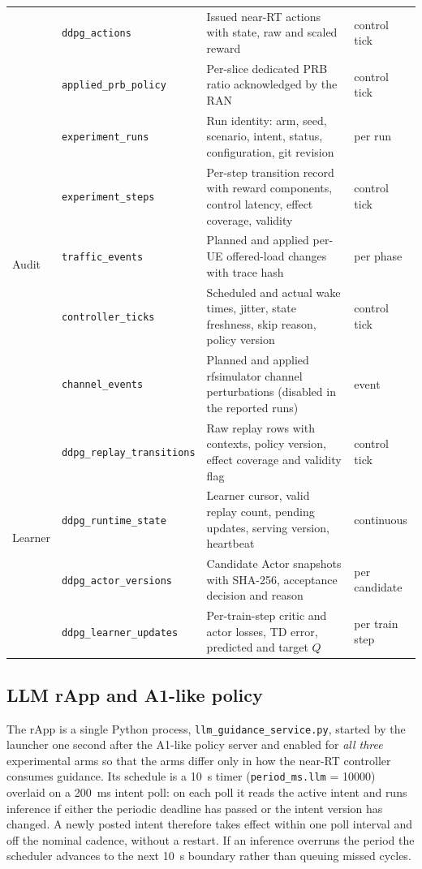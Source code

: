 \begin{table}[t]
\begin{tabular}{llp{}l}
 & \texttt{ddpg\_actions} & Issued near-RT actions with state, raw and scaled reward & control tick\\
 & \texttt{applied\_prb\_policy} & Per-slice dedicated PRB ratio acknowledged by the RAN & control tick\\
\midrule
\multirow{5}{*}{Audit}
 & \texttt{experiment\_runs} & Run identity: arm, seed, scenario, intent, status, configuration, git revision & per run\\
 & \texttt{experiment\_steps} & Per-step transition record with reward components, control latency, effect coverage, validity & control tick\\
 & \texttt{traffic\_events} & Planned and applied per-UE offered-load changes with trace hash & per phase\\
 & \texttt{controller\_ticks} & Scheduled and actual wake times, jitter, state freshness, skip reason, policy version & control tick\\
 & \texttt{channel\_events} & Planned and applied rfsimulator channel perturbations (disabled in the reported runs) & event\\
\midrule
\multirow{4}{*}{Learner}
 & \texttt{ddpg\_replay\_transitions} & Raw replay rows with contexts, policy version, effect coverage and validity flag & control tick\\
 & \texttt{ddpg\_runtime\_state} & Learner cursor, valid replay count, pending updates, serving version, heartbeat & continuous\\
 & \texttt{ddpg\_actor\_versions} & Candidate Actor snapshots with SHA-256, acceptance decision and reason & per candidate\\
 & \texttt{ddpg\_learner\_updates} & Per-train-step critic and actor losses, TD error, predicted and target $Q$ & per train step\\
\bottomrule
\end{tabular}
\end{table}

\subsection{LLM rApp and A1-like policy}
The rApp is a single Python process, \texttt{llm\_guidance\_service.py}, started by the launcher one second after the A1-like policy server and enabled for \emph{all three} experimental arms so that the arms differ only in how the near-RT controller consumes guidance. Its schedule is a 10~s timer (\texttt{period\_ms.llm} = 10000) overlaid on a 200~ms intent poll: on each poll it reads the active intent and runs inference if either the periodic deadline has passed or the intent version has changed. A newly posted intent therefore takes effect within one poll interval and off the nominal cadence, without a restart. If an inference overruns the period the scheduler advances to the next 10~s boundary rather than queuing missed cycles.

